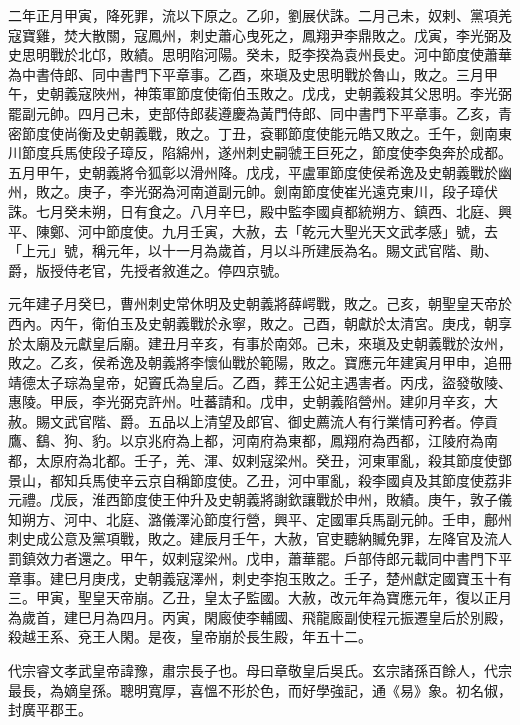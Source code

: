 \begin{pinyinscope}
 二年正月甲寅，降死罪，流以下原之。乙卯，劉展伏誅。二月己未，奴剌、黨項羌寇寶雞，焚大散關，寇鳳州，刺史蕭心曳死之，鳳翔尹李鼎敗之。戊寅，李光弼及史思明戰於北邙，敗績。思明陷河陽。癸未，貶李揆為袁州長史。河中節度使蕭華為中書侍郎、同中書門下平章事。乙酉，來瑱及史思明戰於魯山，敗之。三月甲午，史朝義寇陜州，神策軍節度使衛伯玉敗之。戊戌，史朝義殺其父思明。李光弼罷副元帥。四月己未，吏部侍郎裴遵慶為黃門侍郎、同中書門下平章事。乙亥，青密節度使尚衡及史朝義戰，敗之。丁丑，袞鄆節度使能元皓又敗之。壬午，劍南東川節度兵馬使段子璋反，陷綿州，遂州刺史嗣虢王巨死之，節度使李奐奔於成都。五月甲午，史朝義將令狐彰以滑州降。戊戌，平盧軍節度使侯希逸及史朝義戰於幽州，敗之。庚子，李光弼為河南道副元帥。劍南節度使崔光遠克東川，段子璋伏誅。七月癸未朔，日有食之。八月辛巳，殿中監李國貞都統朔方、鎮西、北庭、興平、陳鄭、河中節度使。九月壬寅，大赦，去「乾元大聖光天文武孝感」號，去「上元」號，稱元年，以十一月為歲首，月以斗所建辰為名。賜文武官階、勛、爵，版授侍老官，先授者敘進之。停四京號。



 元年建子月癸巳，曹州刺史常休明及史朝義將薛崿戰，敗之。己亥，朝聖皇天帝於西內。丙午，衛伯玉及史朝義戰於永寧，敗之。己酉，朝獻於太清宮。庚戌，朝享於太廟及元獻皇后廟。建丑月辛亥，有事於南郊。己未，來瑱及史朝義戰於汝州，敗之。乙亥，侯希逸及朝義將李懷仙戰於範陽，敗之。寶應元年建寅月甲申，追冊靖德太子琮為皇帝，妃竇氏為皇后。乙酉，葬王公妃主遇害者。丙戌，盜發敬陵、惠陵。甲辰，李光弼克許州。吐蕃請和。戊申，史朝義陷營州。建卯月辛亥，大赦。賜文武官階、爵。五品以上清望及郎官、御史薦流人有行業情可矜者。停貢鷹、鷂、狗、豹。以京兆府為上都，河南府為東都，鳳翔府為西都，江陵府為南都，太原府為北都。壬子，羌、渾、奴剌寇梁州。癸丑，河東軍亂，殺其節度使鄧景山，都知兵馬使辛云京自稱節度使。乙丑，河中軍亂，殺李國貞及其節度使荔非元禮。戊辰，淮西節度使王仲升及史朝義將謝欽讓戰於申州，敗績。庚午，敦子儀知朔方、河中、北庭、潞儀澤沁節度行營，興平、定國軍兵馬副元帥。壬申，鄜州刺史成公意及黨項戰，敗之。建辰月壬午，大赦，官吏聽納贓免罪，左降官及流人罰鎮效力者還之。甲午，奴剌寇梁州。戊申，蕭華罷。戶部侍郎元載同中書門下平章事。建巳月庚戌，史朝義寇澤州，刺史李抱玉敗之。壬子，楚州獻定國寶玉十有三。甲寅，聖皇天帝崩。乙丑，皇太子監國。大赦，改元年為寶應元年，復以正月為歲首，建巳月為四月。丙寅，閑廄使李輔國、飛龍廄副使程元振遷皇后於別殿，殺越王系、兗王人閑。是夜，皇帝崩於長生殿，年五十二。



 代宗睿文孝武皇帝諱豫，肅宗長子也。母曰章敬皇后吳氏。玄宗諸孫百餘人，代宗最長，為嫡皇孫。聰明寬厚，喜慍不形於色，而好學強記，通《易》象。初名俶，封廣平郡王。




\end{pinyinscope}
